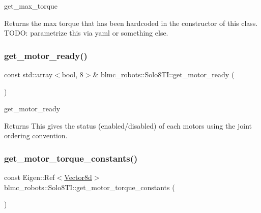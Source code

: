get\+\_\+max\+\_\+torque 

\begin{DoxyReturn}{Returns}
the max torque that has been hardcoded in the constructor of this class. T\+O\+DO\+: parametrize this via yaml or something else. 
\end{DoxyReturn}
\mbox{\label{classblmc__robots_1_1Solo8TI_ae0572a7d9b2ec2b4c63188d0957c5b6f}} 
\subsubsection{\texorpdfstring{get\+\_\+motor\+\_\+ready()}{get\_motor\_ready()}}
{\footnotesize\ttfamily const std\+::array$<$bool, 8$>$\& blmc\+\_\+robots\+::\+Solo8\+T\+I\+::get\+\_\+motor\+\_\+ready (\begin{DoxyParamCaption}{ }\end{DoxyParamCaption})\hspace{0.3cm}{\ttfamily [inline]}}



get\+\_\+motor\+\_\+ready 

\begin{DoxyReturn}{Returns}
This gives the status (enabled/disabled) of each motors using the joint ordering convention. 
\end{DoxyReturn}
\mbox{\label{classblmc__robots_1_1Solo8TI_af421f0fa29744714c5e4a592501b972f}} 
\subsubsection{\texorpdfstring{get\+\_\+motor\+\_\+torque\+\_\+constants()}{get\_motor\_torque\_constants()}}
{\footnotesize\ttfamily const Eigen\+::\+Ref$<$\hyperlink{common__header_8hpp_a98975ffbe0bca1296078e0350dfedd60}{Vector8d}$>$ blmc\+\_\+robots\+::\+Solo8\+T\+I\+::get\+\_\+motor\+\_\+torque\+\_\+constants (\begin{DoxyParamCaption}{ }\end{DoxyParamCaption})\hspace{0.3cm}{\ttfamily [inline]}}



